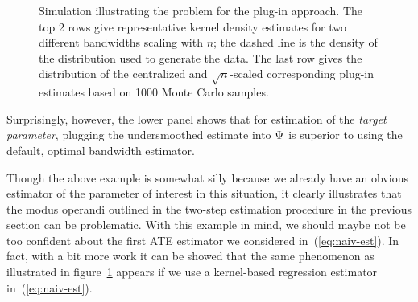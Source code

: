 \documentclass[a4,danish]{article}
\begin{document}
\begin{example}
\begin{figure}[h]
    \caption{Simulation illustrating the problem for the plug-in approach. The top 2 rows give
      representative kernel density estimates for two different bandwidths scaling with $n$; the
      dashed line is the density of the distribution used to generate the data. The last row gives
      the distribution of the centralized and $\sqrt{n}$-scaled corresponding plug-in estimates
      based on 1000 Monte Carlo samples.}
    \label{fig:kernel-undersmoothed}
  \end{figure}
  Surprisingly, however, the lower panel shows that for estimation of the \textit{target parameter},
  plugging the undersmoothed estimate into $\operatorname{\Psi}$ is superior to using the default, optimal bandwidth
  estimator. 
\end{example}


Though the above example is somewhat silly because we already have an obvious estimator of the
parameter of interest in this situation, it clearly illustrates that the modus operandi outlined in
the two-step estimation procedure in the previous section can be problematic. With this example in
mind, we should maybe not be too confident about the first ATE estimator we considered
in~(\ref{eq:naiv-est}). In fact, with a bit more work it can be showed that the same phenomenon as
illustrated in figure~\ref{fig:kernel-undersmoothed} appears if we use a kernel-based regression
estimator in~(\ref{eq:naiv-est}). 
\end{document}
